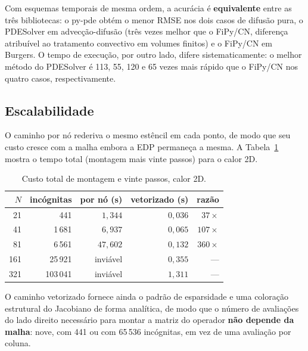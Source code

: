 \documentclass[10pt,brazil,english]{article}
\begin{document}

Com esquemas temporais de mesma ordem, a acurácia é \textbf{equivalente} entre as três bibliotecas: o py-pde obtém o menor RMSE nos dois casos de difusão pura, o PDESolver em advecção-difusão (três vezes melhor que o FiPy/CN, diferença atribuível ao tratamento convectivo em volumes finitos) e o FiPy/CN em Burgers. O tempo de execução, por outro lado, difere sistematicamente: o melhor método do PDESolver é 113, 55, 120 e 65 vezes mais rápido que o FiPy/CN nos quatro casos, respectivamente.

\subsection{Escalabilidade}

O caminho por nó rederiva o mesmo estêncil em cada ponto, de modo que seu custo cresce com a malha embora a EDP permaneça a mesma. A Tabela~\ref{tab:escala} mostra o tempo total (montagem mais vinte passos) para o calor 2D.

\begin{table}[!htb]
\centering
\caption{Custo total de montagem e vinte passos, calor 2D.}
\label{tab:escala}
\begin{tabular}{rrrrr}
\toprule
$N$ & incógnitas & por nó (s) & vetorizado (s) & razão \\
\midrule
21  & 441      & $1{,}344$  & $0{,}036$ & $37\times$ \\
41  & 1\,681   & $6{,}937$  & $0{,}065$ & $107\times$ \\
81  & 6\,561   & $47{,}602$ & $0{,}132$ & $360\times$ \\
161 & 25\,921  & inviável   & $0{,}355$ & --- \\
321 & 103\,041 & inviável   & $1{,}311$ & --- \\
\bottomrule
\end{tabular}
\end{table}

O caminho vetorizado fornece ainda o padrão de esparsidade e uma coloração estrutural do Jacobiano de forma analítica, de modo que o número de avaliações do lado direito necessário para montar a matriz do operador \textbf{não depende da malha}: nove, com 441 ou com 65\,536 incógnitas, em vez de uma avaliação por coluna.
\end{document}
